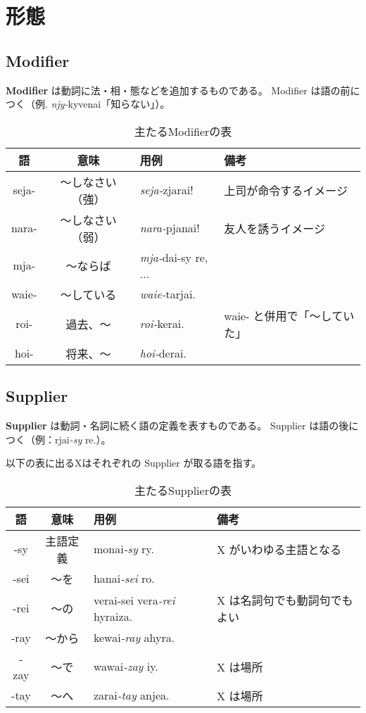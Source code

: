 \section{形態}

\subsection{Modifier}

\textbf{Modifier} は動詞に法・相・態などを追加するものである。
Modifier は語の前につく（例. \emph{njy-}kyvenai「知らない」）。


\begin{table}[h]
    \centering
    \caption{主たるModifierの表}
    \begin{tabular}{ccll}
        \hline
        語 & 意味 & 用例 & 備考 \\
        \hline \hline
        seja- & ～しなさい（強） & \emph{seja-}zjarai! & 上司が命令するイメージ \\
        nara- & ～しなさい（弱） & \emph{nara-}pjanai! & 友人を誘うイメージ\\
        mja-  & ～ならば  & \emph{mja-}dai-sy re, ...& \\
        waie- & ～している & \emph{waie-}tarjai. & \\
        roi-  & 過去、～ & \emph{roi-}kerai. & waie- と併用で「～していた」\\
        hoi-  & 将来、～ & \emph{hoi-}derai. & \\
        \hline
    \end{tabular}
\end{table}

\subsection{Supplier}

\textbf{Supplier} は動詞・名詞に続く語の定義を表すものである。
Supplier は語の後につく（例：rjai\emph{-sy} re.）。

以下の表に出るXはそれぞれの Supplier が取る語を指す。

\begin{table}[h]
    \centering
    \caption{主たるSupplierの表}
    \begin{tabular}{ccll}
        \hline
        語 & 意味 & 用例 & 備考 \\
        \hline \hline
        -sy  & 主語定義 & monai\emph{-sy} ry. & X がいわゆる主語となる \\
        -sei & ～を & hanai\emph{-sei} ro.           & \\
        -rei & ～の & verai-sei vera\emph{-rei} hyraiza.   & X は名詞句でも動詞句でもよい \\
        -ray & ～から & kewai\emph{-ray} ahyra.            & \\
        -zay & ～で & wawai\emph{-zay} iy.           & X は場所 \\
        -tay & ～へ & zarai\emph{-tay} anjea.              & X は場所 \\
        \hline
    \end{tabular}
\end{table}

